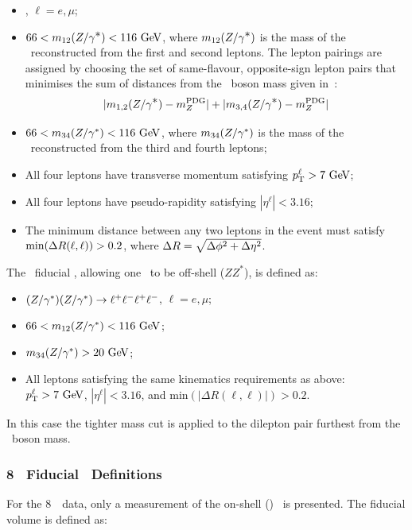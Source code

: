 \begin{itemize}
\item{\ZorgZorgllll, $\ell = e,\mu$;}
\item{ $66 < m_{12}(\Zorgv) <  116\GeV$, where $m_{12}(Z/\gamma^{\textstyle *})$ is
the mass of the \Z\ reconstructed from the first and second leptons.  The
lepton pairings are assigned by choosing the set of 
same-flavour, opposite-sign lepton pairs that minimises the sum of distances from
the \Z\ boson mass given in~\cite{PDG}:
\begin{equation}
|m_{1,2}(Z/\gamma^{\textstyle *}) - m_{Z}^{\rm PDG}| + |m_{3,4}(Z/\gamma^{\textstyle *}) - m_{Z}^{\rm PDG}|
\end{equation}
}
\item{ $66 < m_{34}(\Z/\gamma^*) <  116\GeV$, where $m_{34}(Z/\gamma^*)$ is
the mass of the \Z\ reconstructed from the third and fourth leptons;}
\item All four leptons have transverse momentum satisfying $\pT^{\ell} > 7\GeV$;
\item All four leptons have pseudo-rapidity satisfying $|\eta^{\ell}| < 3.16$;
\item{ The minimum distance between any two leptons in the event must satisfy
$\mathrm{min}(\Delta R(\ell,\ell)) > 0.2$, where $\Delta R = \sqrt{\Delta \phi^{2} +
\Delta \eta^{2}}$.}
\end{itemize}

The \ZZsllll\ fiducial \cx , allowing one \Z\ to be off-shell ($ZZ^*$), is defined as:

\begin{itemize}
\item $(Z/\gamma^*)(Z/\gamma^*)\rightarrow\ell^+ \ell^-\ell^+ \ell^-$, $\ell = e,\mu$;
\item $66 < m_{12}(\Z/\gamma^*) <  116\GeV$;
\item $m_{34}(\Z/\gamma^*) > 20\GeV$;
\item All leptons satisfying the same kinematics requirements as above:
$\pT^{\ell} > 7\GeV$,
$|\eta^{\ell}| < 3.16$,
and $\mathrm{min}(|\Delta R(\ell,\ell)|) > 0.2$.
\end{itemize}
In this case the tighter mass cut is applied to the dilepton pair furthest from the \Z\
boson mass.

\subsubsection{8 \tev\ Fiducial \CX\ Definitions}

For the 8~\tev\ data, only a measurement of the on-shell (\ZZ) \cx\ is
presented. The fiducial volume is defined as:

